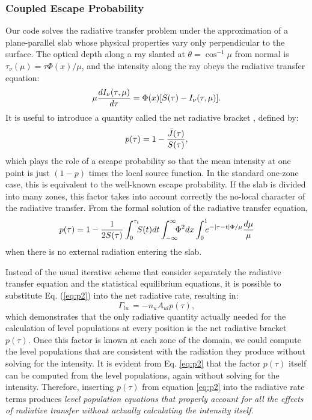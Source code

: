 \documentclass[12pt]{article}
\def\Jbar     {\hbox{$\bar J$}}
\def\tot      {\tau_t}
\begin{document}
\subsubsection{Coupled Escape Probability} Our code solves the radiative
transfer problem under the approximation of a plane-parallel slab whose
physical properties vary only perpendicular to the surface.  The optical depth
along a ray slanted at $\theta = \cos^{-1} \mu$ from normal is $\tau_\nu(\mu) =
\tau\Phi(x)/\mu$, and the intensity along the ray obeys the radiative transfer
equation:
\begin{equation}
\label{eq:rad_tran}
     \mu{dI_\nu(\tau, \mu)\over d\tau} = \Phi(x)[S(\tau) - I_\nu(\tau, \mu)].
\end{equation}
It is useful to introduce a quantity called the net radiative
bracket \citep{athay_skumanich71}, defined by:
\begin{equation}
\label{eq:p1}
   p(\tau) = 1 - {\Jbar(\tau)\over S(\tau)},
\end{equation}
which plays the role of a escape probability so that the mean intensity at one point
is just $(1-p)$ times the local source function. In the standard one-zone
case, this is equivalent to the well-known escape probability. If the slab
is divided into many zones, this factor takes into account correctly the
no-local character of the radiative transfer. From the formal solution of
the radiative transfer equation,
\begin{equation}
\label{eq:p2}
   p(\tau) = 1 - {1\over 2S(\tau)}\int_0^{\tot}\!\!\! S(t)dt
                 \int_{-\infty}^{\infty}\!\!\!\Phi^2dx
                \int_0^1\!\!\! e^{-|\tau - t|\Phi/\mu}{d\mu\over\mu}
\end{equation}
when there is no external radiation entering the slab.

Instead of the usual iterative scheme that consider separately the
radiative transfer equation and the statistical equilibrium equations,
it is possible to substitute Eq. (\ref{eq:p2}) into the net
radiative rate, resulting in:
\begin{equation}
\label{eq:netrate_withp}
\Gamma_{lu}\,=- n_u A_{ul} p(\tau),
\end{equation}
which demonstrates that the only radiative quantity actually needed for the calculation of
level populations at every position is the net radiative bracket $p(\tau)$.
Once this factor is known at each zone of the domain, we could compute the
level populations that are consistent with the radiation they produce without solving
for the intensity. It is evident from Eq. \ref{eq:p2} that the factor $p(\tau)$ itself
can be computed from the level populations, again without solving  for the
intensity. Therefore, inserting $p(\tau)$ from equation \ref{eq:p2} into the
radiative rate terms produces {\em level population equations that
properly account for all the effects of radiative transfer without actually
calculating the intensity itself}.
\end{document}
